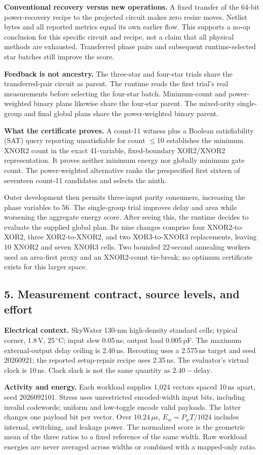 \documentclass[10pt]{article}
\newcommand{\sect}[1]{\subsection*{#1}}
\begin{document}
\textbf{Conventional recovery versus new operations.} A fixed transfer of the 64-bit power-recovery recipe to the projected circuit makes zero resize moves. Netlist bytes and all reported metrics equal its own earlier flow. This supports a no-op conclusion for this specific circuit and recipe, not a claim that all physical methods are exhausted. Transferred phase pairs and subsequent runtime-selected star batches still improve the score.

\textbf{Feedback is not ancestry.} The three-star and four-star trials share the transferred-pair circuit as parent. The runtime reads the first trial's real measurements before selecting the four-star batch. Minimum-count and power-weighted binary plans likewise share the four-star parent. The mixed-arity single-group and final global plans share the power-weighted binary parent.

\textbf{What the certificate proves.} A count-11 witness plus a Boolean satisfiability (SAT) query reporting unsatisfiable for count $\leq10$ establishes the minimum XNOR2 count in the exact 41-variable, fixed-boundary XOR2/XNOR2 representation. It proves neither minimum energy nor globally minimum gate count. The power-weighted alternative ranks the prespecified first sixteen of seventeen count-11 candidates and selects the ninth.

Outer development then permits three-input parity consumers, increasing the phase variables to 56. The single-group trial improves delay and area while worsening the aggregate energy score. After seeing this, the runtime decides to evaluate the supplied global plan. Its nine changes comprise four XNOR2-to-XOR2, three XOR2-to-XNOR2, and two XOR3-to-XNOR3 replacements, leaving 10 XNOR2 and seven XNOR3 cells. Two bounded 22-second annealing workers used an area-first proxy and an XNOR2-count tie-break; no optimum certificate exists for this larger space.

\newpage
\sect{5. Measurement contract, source levels, and effort}
\textbf{Electrical context.} SkyWater 130-nm high-density standard cells; typical corner, 1.8\,V, 25\,$^\circ$C; input slew 0.05\,ns; output load 0.005\,pF. The maximum external-output delay ceiling is 2.40\,ns. Rerouting uses a 2.575\,ns target and seed 20260921; the reported setup-repair recipe uses 2.35\,ns. The evaluator's virtual clock is 10\,ns. Clock slack is not the same quantity as $2.40-\mathrm{delay}$.

\textbf{Activity and energy.} Each workload supplies 1,024 vectors spaced 10\,ns apart, seed 2026092101. Stress uses unrestricted encoded-width input bits, including invalid codewords; uniform and low-toggle encode valid payloads. The latter changes one payload bit per vector. Over $10.24\,\mu$s, $E_w=P_wT/1024$ includes internal, switching, and leakage power. The normalized score is the geometric mean of the three ratios to a fixed reference of the same width. Raw workload energies are never averaged across widths or combined with a mapped-only ratio.
\end{document}
